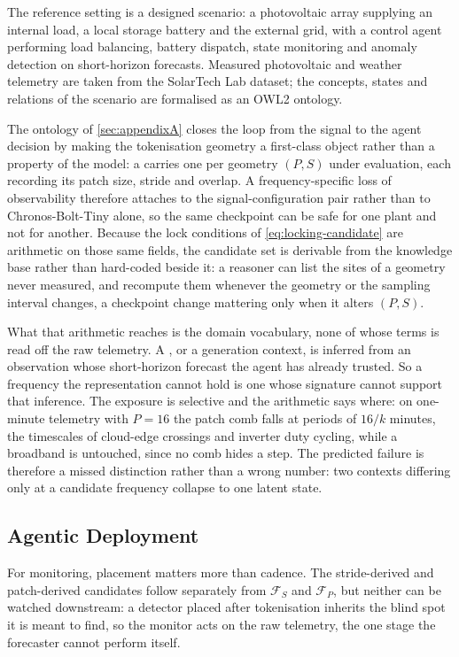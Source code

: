 The reference setting is a designed scenario: a photovoltaic array supplying an internal load, a local storage battery and the external grid, with a control agent performing load balancing, battery dispatch, state monitoring and anomaly detection on short-horizon forecasts. Measured photovoltaic and weather telemetry are taken from the SolarTech Lab dataset\autocite{levaPhotovoltaicPowerWeather2020}; the concepts, states and relations of the scenario are formalised as an OWL2 ontology.

The ontology of \autoref{sec:appendixA} closes the loop from the signal to the agent decision by making the tokenisation geometry a first-class object rather than a property of the model: a  carries one  per geometry $(P,S)$ under evaluation, each recording its patch size, stride and overlap. A frequency-specific loss of observability therefore attaches to the signal-configuration pair rather than to Chronos-Bolt-Tiny alone, so the same checkpoint can be safe for one plant and not for another. Because the lock conditions of \autoref{eq:locking-candidate} are arithmetic on those same fields, the candidate set is derivable from the knowledge base rather than hard-coded beside it: a reasoner can list the sites of a geometry never measured, and recompute them whenever the geometry or the sampling interval changes, a checkpoint change mattering only when it alters $(P,S)$.

What that arithmetic reaches is the domain vocabulary, none of whose terms is read off the raw telemetry. A , or a  generation context, is inferred from an observation whose short-horizon forecast the agent has already trusted. So a frequency the representation cannot hold is one whose signature cannot support that inference. The exposure is selective and the arithmetic says where: on one-minute telemetry with $P=16$ the patch comb falls at periods of $16/k$ minutes, the timescales of cloud-edge crossings and inverter duty cycling, while a broadband  is untouched, since no comb hides a step. The predicted failure is therefore a missed distinction rather than a wrong number: two contexts differing only at a candidate frequency collapse to one latent state.

\subsection*{Agentic Deployment}
For monitoring, placement matters more than cadence. The stride-derived and patch-derived candidates follow separately from $\mathcal{F}_{S}$ and $\mathcal{F}_{P}$, but neither can be watched downstream: a detector placed after tokenisation inherits the blind spot it is meant to find, so the monitor acts on the raw telemetry, the one stage the forecaster cannot perform itself.

